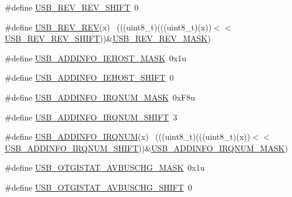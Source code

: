 \begin{DoxyCompactItemize}
\item 
\#define \hyperlink{group___u_s_b___register___masks_gab058ebe4be52454e46ef15ce015ac5fd}{U\+S\+B\+\_\+\+R\+E\+V\+\_\+\+R\+E\+V\+\_\+\+S\+H\+I\+FT}~0
\item 
\#define \hyperlink{group___u_s_b___register___masks_ga07d0c26b6db6e64d946e60bbd8879db0}{U\+S\+B\+\_\+\+R\+E\+V\+\_\+\+R\+EV}(x)                                                  ~(((uint8\+\_\+t)(((uint8\+\_\+t)(x))$<$$<$\hyperlink{group___u_s_b___register___masks_gab058ebe4be52454e46ef15ce015ac5fd}{U\+S\+B\+\_\+\+R\+E\+V\+\_\+\+R\+E\+V\+\_\+\+S\+H\+I\+FT}))\&\hyperlink{group___u_s_b___register___masks_ga72a356a066674e41e3827b0ccb931e71}{U\+S\+B\+\_\+\+R\+E\+V\+\_\+\+R\+E\+V\+\_\+\+M\+A\+SK})
\item 
\#define \hyperlink{group___u_s_b___register___masks_gacb7c792034c73c4861bc8fba6ff4314f}{U\+S\+B\+\_\+\+A\+D\+D\+I\+N\+F\+O\+\_\+\+I\+E\+H\+O\+S\+T\+\_\+\+M\+A\+SK}~0x1u
\item 
\#define \hyperlink{group___u_s_b___register___masks_gad256dcdfe8443877169b69dbcc8a041e}{U\+S\+B\+\_\+\+A\+D\+D\+I\+N\+F\+O\+\_\+\+I\+E\+H\+O\+S\+T\+\_\+\+S\+H\+I\+FT}~0
\item 
\#define \hyperlink{group___u_s_b___register___masks_gaa578584bfaf89e26213e6ba12e5f4b0e}{U\+S\+B\+\_\+\+A\+D\+D\+I\+N\+F\+O\+\_\+\+I\+R\+Q\+N\+U\+M\+\_\+\+M\+A\+SK}~0x\+F8u
\item 
\#define \hyperlink{group___u_s_b___register___masks_ga3332243caa9e2f9cfc49b031ac54cbda}{U\+S\+B\+\_\+\+A\+D\+D\+I\+N\+F\+O\+\_\+\+I\+R\+Q\+N\+U\+M\+\_\+\+S\+H\+I\+FT}~3
\item 
\#define \hyperlink{group___u_s_b___register___masks_ga1af2106db3477ecccb2d3b1c627c6da1}{U\+S\+B\+\_\+\+A\+D\+D\+I\+N\+F\+O\+\_\+\+I\+R\+Q\+N\+UM}(x)                                    ~(((uint8\+\_\+t)(((uint8\+\_\+t)(x))$<$$<$\hyperlink{group___u_s_b___register___masks_ga3332243caa9e2f9cfc49b031ac54cbda}{U\+S\+B\+\_\+\+A\+D\+D\+I\+N\+F\+O\+\_\+\+I\+R\+Q\+N\+U\+M\+\_\+\+S\+H\+I\+FT}))\&\hyperlink{group___u_s_b___register___masks_gaa578584bfaf89e26213e6ba12e5f4b0e}{U\+S\+B\+\_\+\+A\+D\+D\+I\+N\+F\+O\+\_\+\+I\+R\+Q\+N\+U\+M\+\_\+\+M\+A\+SK})
\item 
\#define \hyperlink{group___u_s_b___register___masks_ga4aed6ee50bdd46063aa551dfb6e91d80}{U\+S\+B\+\_\+\+O\+T\+G\+I\+S\+T\+A\+T\+\_\+\+A\+V\+B\+U\+S\+C\+H\+G\+\_\+\+M\+A\+SK}~0x1u
\item 
\#define \hyperlink{group___u_s_b___register___masks_ga0b762b08ffd3b747e2d0ad17b5f1641a}{U\+S\+B\+\_\+\+O\+T\+G\+I\+S\+T\+A\+T\+\_\+\+A\+V\+B\+U\+S\+C\+H\+G\+\_\+\+S\+H\+I\+FT}~0

\end{DoxyCompactItemize}
